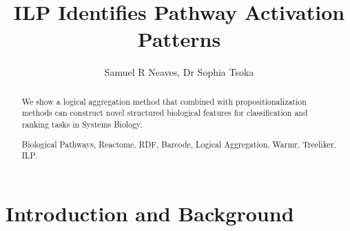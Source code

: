 \documentclass[runningheads,a4paper]{llncs}
\newcommand{\keywords}[1]{\par\addvspace\baselineskip
\noindent\keywordname\enspace\ignorespaces#1}
\begin{document}
\mainmatter  %


\title{ILP Identifies Pathway Activation Patterns}

%
%
\author{Samuel R Neaves, Dr Sophia Tsoka}
%


%
%

\maketitle


\begin{abstract}
We show a logical aggregation method that combined with propositionalization methods can construct novel structured biological features for classification and ranking tasks in Systems Biology. 

\keywords{Biological Pathways, Reactome, RDF, Barcode, Logical Aggregation, Warmr, Treeliker, ILP.}
\end{abstract}



\section{Introduction and Background}
\end{document}
